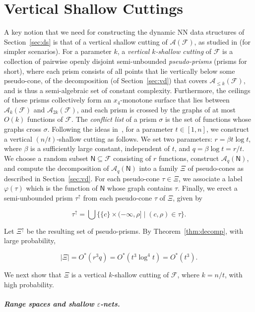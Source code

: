 \documentclass[11pt]{article}
\newif\ifsocgproc
\def\eps{{\varepsilon}}
\def\A{\mathcal{A}}
\def\F{\mathcal{F}}
\def\cell{\tau}
\def\NN{\mathsf{N}}
\def\Ak#1{\A_{{\le}#1}}
\theoremstyle{definition}
\begin{document}
\section{Vertical Shallow Cuttings} \label{sec:shallow}
%
A key notion that we need for constructing the dynamic NN data structures of Section~\ref{sec:ds}
is that of a vertical shallow cutting of $\A(\F)$, 
as studied in \cite{Chan:le,CT16,KMRSS} (for simpler scenarios). For a parameter $k$, a 
\emph{vertical $k$-shallow cutting} of $\F$ is a collection of pairwise openly disjoint 
semi-unbounded \emph{pseudo-prisms} (prisms for short), where each prism consists of all points 
that lie vertically below some pseudo-cone, of the decomposition (of Section~\ref{sec:vd}) 
that covers $\Ak{k} (\F)$,
and is thus a semi-algebraic set of constant complexity. 
Furthermore, the ceilings of these prisms collectively form an $x_4$-monotone surface that lies 
between $\A_k(\F)$ and $\A_{2k}(\F)$, and each prism is crossed by the graphs of at most 
$O(k)$ functions of $\F$. The \emph{conflict list} of a prism $\sigma$ is the set of 
functions whose graphs cross $\sigma$.
%
Following the ideas in~\cite{KMRSS}, for a parameter $t \in [1,n]$,
we construct a vertical $(n/t)$-shallow cutting as follows.
We set two parameters: $r=\beta t \log t$, where $\beta$ is a sufficiently large constant, independent
of $t$, and $q=\beta \log t = r/t$. We choose a random subset $\NN \subseteq \F$ consisting of $r$ functions,
construct $\A_q(\NN)$, and compute the decomposition of $\A_q(\NN)$ into a family $\Xi$ of pseudo-cones 
as described in Section~\ref{sec:vd}. For each pseudo-cone $\cell \in \Xi$, we associate a label 
$\varphi(\cell)$ which is the function of $\NN$ whose graph contains $\cell$. Finally, we erect a 
semi-unbounded prism $\cell^\uparrow$ from each pseudo-cone $\cell$ of $\Xi$, given by
\ifsocgproc
$\cell^\uparrow = \bigcup \{ \{c\} \times(-\infty, \rho] \mid (c,\rho) \in \cell\}$.
\else
\[
\cell^\uparrow = \bigcup \{ \{c\} \times(-\infty, \rho] \mid (c,\rho) \in \cell\}.
\] 
\fi
Let $\Xi^\uparrow$ be the resulting set of pseudo-prisms. By Theorem~\ref{thm:decomp}, with large probability,
\ifsocgproc
$|\Xi| = O^*(r^3q) =  O^*(t^3)$.
\else
\[
|\Xi| = O^*(r^3q) = O^*(t^3\log^4t) = O^*(t^3).
\]
\fi
We next show that $\Xi$ is a vertical $k$-shallow cutting of $\F$, where $k = n/t$, with high probability.
%
\ifsocgproc 
\subparagraph*{Range spaces and shallow $\eps$-nets.}
\else
\end{document}
